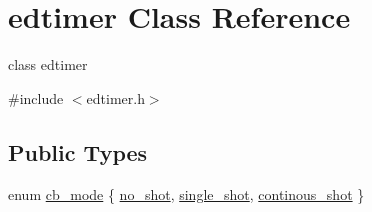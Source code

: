 \hypertarget{classedtimer}{\section{edtimer Class Reference}
\label{classedtimer}
}


class edtimer  




{\ttfamily \#include $<$edtimer.\-h$>$}

\subsection*{Public Types}
\begin{DoxyCompactItemize}
\item 
enum \hyperlink{classedtimer_adf4b2a0dcb914d94b59f8dd4a0ae4f09}{cb\-\_\-mode} \{ \hyperlink{classedtimer_adf4b2a0dcb914d94b59f8dd4a0ae4f09a6401fc860ee0413f08594b95216cbd93}{no\-\_\-shot}, 
\hyperlink{classedtimer_adf4b2a0dcb914d94b59f8dd4a0ae4f09a0d89310ad0b56d46e996c74eecaa4fa4}{single\-\_\-shot}, 
\hyperlink{classedtimer_adf4b2a0dcb914d94b59f8dd4a0ae4f09ab949e0f48e271fc30ddac9e033fa2f69}{continous\-\_\-shot}
 \}
\end{DoxyCompactItemize}
